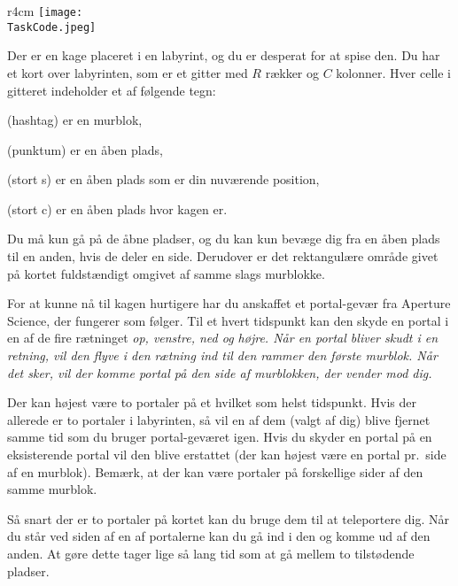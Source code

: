 \documentclass{boi2014-dk}
\renewcommand{\TaskCode}{portals}
\newcommand{\constant}[1]{{\tt #1}}
\begin{document}
    \begin{wrapfigure}[4]{r}{4cm}
        \vspace{-24pt}
		\texttt{[image: \\TaskCode.jpeg]}
	\end{wrapfigure}

    Der er en kage placeret i en labyrint, og du er desperat for at spise
    den. Du har et kort over labyrinten, som er et gitter med $R$ rækker og $C$
    kolonner. Hver celle i gitteret indeholder et af følgende tegn:
    \begin{description}[itemindent=1pt]
    	\item[\constant{\#}] (hashtag) er en murblok,
        \item[\constant{.}] (punktum) er en åben plads,
        \item[\constant{S}] (stort s) er en åben plads som er din
            nuværende position,
        \item[\constant{C}] (stort c) er en åben plads hvor kagen er.
    \end{description}

    Du må kun gå på de åbne pladser, og du kan kun bevæge dig fra en åben plads
    til en anden, hvis de deler en side. Derudover er det rektangulære område
    givet på kortet fuldstændigt omgivet af samme slags murblokke.

    For at kunne nå til kagen hurtigere har du anskaffet et portal-gevær
    fra Aperture Science\texttrademark{}, der fungerer som følger.
    Til et hvert tidspunkt kan den skyde en portal i en af de fire rætninget
    \em{op}, \em{venstre}, \em{ned} og \em{højre}. Når en portal bliver skudt i
    en retning, vil den flyve i den rætning ind til den rammer den første
    murblok. Når det sker, vil der komme portal på den side af murblokken,
    der vender mod dig.

    Der kan højest være to portaler på et hvilket som helst tidspunkt. Hvis der
    allerede er to portaler i labyrinten, så vil en af dem (valgt af dig) blive
    fjernet samme tid som du bruger portal-geværet igen. Hvis du skyder en
    portal på en eksisterende portal vil den blive erstattet
    (der kan højest være en portal pr.~side af en murblok). Bemærk, at der
    kan være portaler på forskellige sider af den samme murblok.

    Så snart der er to portaler på kortet kan du bruge dem til at teleportere
    dig. Når du står ved siden af en af portalerne kan du gå ind i den og komme
    ud af den anden. At gøre dette tager lige så lang tid som at gå mellem to
    tilstødende pladser.
\end{document}
